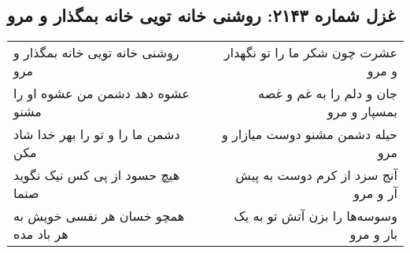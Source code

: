 \begin{center}
\section*{غزل شماره ۲۱۴۳: روشنی خانه تویی خانه بمگذار و مرو}
\label{sec:2143}
\begin{longtable}{l p{0.5cm} r}
روشنی خانه تویی خانه بمگذار و مرو
&&
عشرت چون شکر ما را تو نگهدار و مرو
\\
عشوه دهد دشمن من عشوه او را مشنو
&&
جان و دلم را به غم و غصه بمسپار و مرو
\\
دشمن ما را و تو را بهر خدا شاد مکن
&&
حیله دشمن مشنو دوست میازار و مرو
\\
هیچ حسود از پی کس نیک نگوید صنما
&&
آنج سزد از کرم دوست به پیش آر و مرو
\\
همچو خسان هر نفسی خویش به هر باد مده
&&
وسوسه‌ها را بزن آتش تو به یک بار و مرو
\\
\end{longtable}
\end{center}
